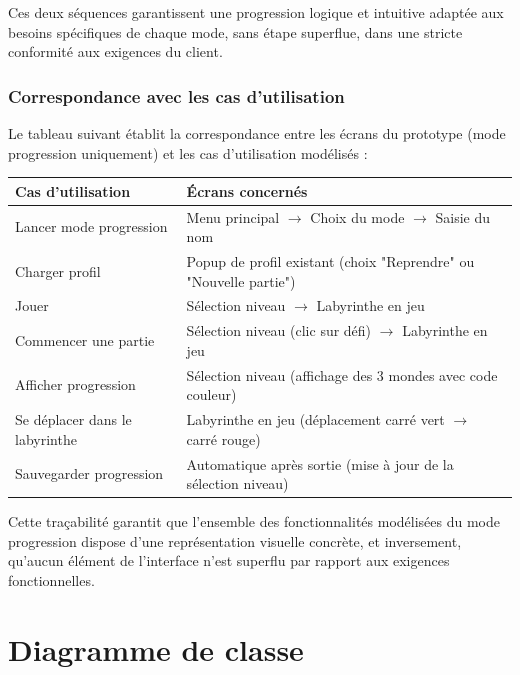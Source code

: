 \documentclass{butexFR}
\begin{document}
Ces deux séquences garantissent une progression logique et intuitive adaptée aux besoins spécifiques de chaque mode, sans étape superflue, dans une stricte conformité aux exigences du client.

\subsubsection{Correspondance avec les cas d'utilisation}

Le tableau suivant établit la correspondance entre les écrans du prototype (mode progression uniquement) et les cas d'utilisation modélisés :

\vspace{1em}
\begin{center}
\begin{tabular}{|p{5cm}|p{8cm}|}
\hline
\textbf{Cas d'utilisation} & \textbf{Écrans concernés} \\
\hline
Lancer mode progression & Menu principal $\rightarrow$ Choix du mode $\rightarrow$ Saisie du nom \\
\hline
Charger profil & Popup de profil existant (choix "Reprendre" ou "Nouvelle partie") \\
\hline
Jouer & Sélection niveau $\rightarrow$ Labyrinthe en jeu \\
\hline
Commencer une partie & Sélection niveau (clic sur défi) $\rightarrow$ Labyrinthe en jeu \\
\hline
Afficher progression & Sélection niveau (affichage des 3 mondes avec code couleur) \\
\hline
Se déplacer dans le labyrinthe & Labyrinthe en jeu (déplacement carré vert $\rightarrow$ carré rouge) \\
\hline
Sauvegarder progression & Automatique après sortie (mise à jour de la sélection niveau) \\
\hline
\end{tabular}
\end{center}
\vspace{1em}

Cette traçabilité garantit que l'ensemble des fonctionnalités modélisées du mode progression dispose d'une représentation visuelle concrète, et inversement, qu'aucun élément de l'interface n'est superflu par rapport aux exigences fonctionnelles.

\newpage

\section{Diagramme de classe}
\end{document}
